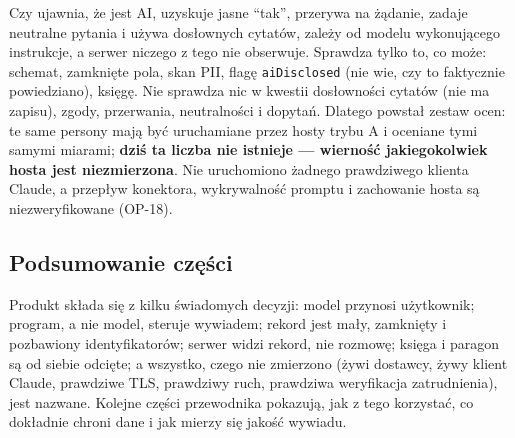  Czy ujawnia, że jest AI, uzyskuje jasne ``tak'',
przerywa na żądanie, zadaje neutralne pytania i używa dosłownych cytatów, zależy
od modelu wykonującego instrukcje, a serwer niczego z tego nie obserwuje.
Sprawdza tylko to, co może: schemat, zamknięte pola, skan PII, flagę
\texttt{aiDisclosed} (nie wie, czy to faktycznie powiedziano), księgę. Nie
sprawdza nic w kwestii dosłowności cytatów (nie ma zapisu), zgody, przerwania,
neutralności i dopytań. Dlatego powstał zestaw ocen: te same persony mają być
uruchamiane przez hosty trybu A i oceniane tymi samymi miarami; \textbf{dziś ta
liczba nie istnieje --- wierność jakiegokolwiek hosta jest niezmierzona}.
Nie uruchomiono żadnego prawdziwego klienta Claude, a przepływ konektora,
wykrywalność promptu i zachowanie hosta są niezweryfikowane (OP-18).

\subsection{Podsumowanie części}

Produkt składa się z kilku świadomych decyzji: model przynosi użytkownik;
program, a nie model, steruje wywiadem; rekord jest mały, zamknięty i
pozbawiony identyfikatorów; serwer widzi rekord, nie rozmowę; księga i paragon
są od siebie odcięte; a wszystko, czego nie zmierzono (żywi dostawcy, żywy
klient Claude, prawdziwe TLS, prawdziwy ruch, prawdziwa weryfikacja
zatrudnienia), jest nazwane. Kolejne części przewodnika pokazują, jak z tego
korzystać, co dokładnie chroni dane i jak mierzy się jakość wywiadu.
